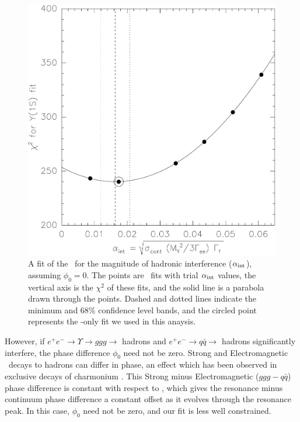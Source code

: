 \documentclass{cornell}
\begin{document}
\begin{figure}[p]
  \begin{center}
    \includegraphics[width=0.8\linewidth]{newplots/simpleintfit}
  \end{center}
  \caption[Best-fit interference between resonance and continuum
  \qqbar]{\label{simpleintfit} A fit of the \us\ for the magnitude of
  hadronic interference ($\alpha_{\mbox{\scriptsize int}}$), assuming $\phi_0 = 0$.
  The points are \us\ fits with trial $\alpha_{\mbox{\scriptsize int}}$ values, the
  vertical axis is the $\chi^2$ of these fits, and the solid line is a
  parabola drawn through the points.  Dashed and dotted lines indicate
  the minimum and 68\% confidence level bands, and the circled point
  represents the \qqbar-only fit we used in this anaysis.}
\end{figure}

However, if $e^+e^- \to \Upsilon \to ggg \to$ hadrons and $e^+e^- \to
q\bar{q} \to$ hadrons significantly interfere, the phase difference
$\phi_0$ need not be zero.  Strong and Electromagnetic \ups\ decays to
hadrons can differ in phase, an effect which has been observed in
exclusive decays of charmonium \cite{charmphase}
\cite{charmcharmphase}.  This Strong minus Electromagnetic ($ggg -
q\bar{q}$) phase difference is constant with respect to \ecm, which
gives the resonance minus continuum phase difference a constant offset
as it evolves through the resonance peak.  In this case, $\phi_0$ need
not be zero, and our fit is less well constrained.
\end{document}
